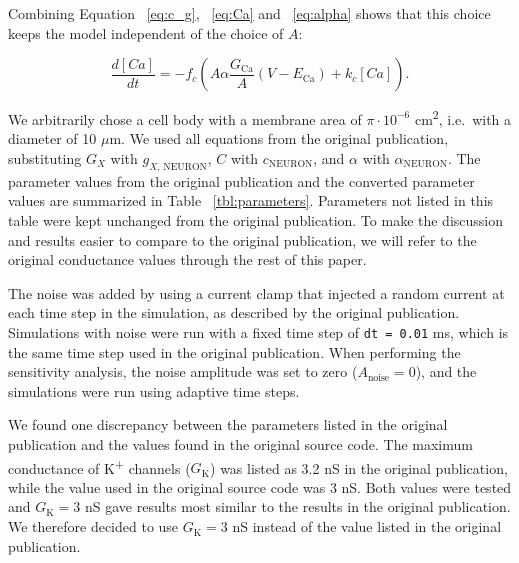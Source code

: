 \documentclass[10pt,a4paper,onecolumn]{article}
\begin{document}
\noindent
Combining Equation ~\ref{eq:c_g}, ~\ref{eq:Ca} and ~\ref{eq:alpha} shows
that this choice keeps the model independent of the choice of \(A\):

\begin{equation}\frac{d[Ca]}{dt} = - f_c (A\alpha \frac{G_{\mathrm{Ca}}}{A}(V - E_{\mathrm{Ca}}) + k_c[Ca]).\label{eq:Ca_A}\end{equation}

We arbitrarily chose a cell body with a membrane area of
\(\pi \cdot 10^{-6}\) cm\textsuperscript{2}, i.e.~with a diameter of 10
\(\mu\)m. We used all equations from the original publication,
substituting \(G_X\) with \(g_{X,\,\mathrm{NEURON}}\), \(C\) with
\(c_{\mathrm{NEURON}}\), and \(\alpha\) with
\(\alpha_{\mathrm{NEURON}}\). The parameter values from the original
publication and the converted parameter values are summarized in Table
~\ref{tbl:parameters}. Parameters not listed in this table were kept
unchanged from the original publication. To make the discussion and
results easier to compare to the original publication, we will refer to
the original conductance values through the rest of this paper.

The noise was added by using a current clamp that injected a random
current at each time step in the simulation, as described by the
original publication. Simulations with noise were run with a fixed time
step of \texttt{dt\ =\ 0.01} ms, which is the same time step used in the
original publication. When performing the sensitivity analysis, the
noise amplitude was set to zero (\(A_{\mathrm{noise}} = 0\)), and the
simulations were run using adaptive time steps.

We found one discrepancy between the parameters listed in the original
publication and the values found in the original source code. The
maximum conductance of K\textsuperscript{+} channels
(\(G_{\mathrm{K}}\)) was listed as 3.2 nS in the original publication,
while the value used in the original source code was 3 nS. Both values
were tested and \(G_{\mathrm{K}} = 3\) nS gave results most similar to
the results in the original publication. We therefore decided to use
\(G_{\mathrm{K}} = 3\) nS instead of the value listed in the original
publication.
\end{document}
